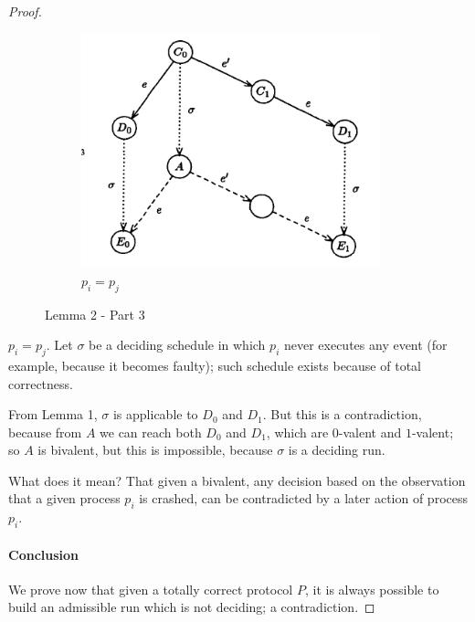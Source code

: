\documentclass[12pt]{article}
\begin{document}
\begin{proof}
\begin{figure}
\begin{subfigure}[b]{0.70\textwidth}
\begin{center}
\includegraphics[width=0.95\textwidth]{figs/06/consensus-fig3.png}
\end{center}
\caption{$p_i = p_j$}
\end{subfigure}
\caption{Lemma 2 - Part 3}
\end{figure}


\item $p_i = p_j$. Let $\sigma$ be a deciding schedule in which $p_i$ never
  executes any event (for example, because it becomes faulty); such schedule
  exists because of total correctness.
  
  From Lemma 1, $\sigma$ is applicable to $D_0$ and $D_1$. But this is a
  contradiction, because from $A$ we can reach both $D_0$ and $D_1$,
  which are $0$-valent and $1$-valent; so $A$ is bivalent, but this
  is impossible, because $\sigma$ is a deciding run.

\EI

\begin{figure}
\end{figure}

What does it mean? That given a bivalent, any decision based on the
observation that a given process $p_i$ is crashed, can be contradicted
by a later action of process $p_i$.

\newpage
\paragraph{Conclusion}

We prove now that given a totally correct protocol $P$, it is always possible 
to build an admissible run which is not deciding; a contradiction.


\end{proof}
\end{document}
